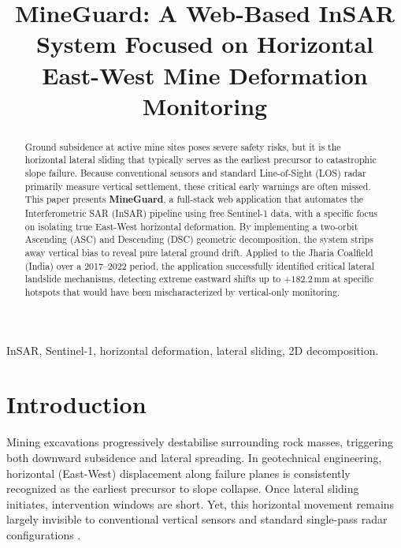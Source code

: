 \documentclass[conference]{IEEEtran}
\begin{document}
\title{MineGuard: A Web-Based InSAR System Focused on
Horizontal East-West Mine Deformation Monitoring}

\author{
}

\maketitle

\begin{abstract}
Ground subsidence at active mine sites poses severe safety risks, but
it is the horizontal lateral sliding that typically serves as the
earliest precursor to catastrophic slope failure. Because conventional
sensors and standard Line-of-Sight (LOS) radar primarily measure vertical
settlement, these critical early warnings are often missed. This paper
presents \textbf{MineGuard}, a full-stack web application that
automates the Interferometric SAR (InSAR) pipeline using free
Sentinel-1 data, with a specific focus on isolating true East-West
horizontal deformation. By implementing a two-orbit Ascending (ASC)
and Descending (DSC) geometric decomposition, the system strips away
vertical bias to reveal pure lateral ground drift. Applied to the
Jharia Coalfield (India) over a 2017–2022 period, the application
successfully identified critical lateral landslide mechanisms,
detecting extreme eastward shifts up to $+182.2$\,mm at specific 
hotspots that would have been mischaracterized by vertical-only monitoring.
\end{abstract}

\begin{IEEEkeywords}
InSAR, Sentinel-1, horizontal deformation, lateral sliding, 2D decomposition.
\end{IEEEkeywords}

\section{Introduction}

Mining excavations progressively destabilise surrounding rock masses,
triggering both downward subsidence and lateral spreading. In geotechnical
engineering, horizontal (East-West) displacement along failure planes
is consistently recognized as the earliest precursor to slope collapse.
Once lateral sliding initiates, intervention windows are short. Yet, this
horizontal movement remains largely invisible to conventional vertical
sensors and standard single-pass radar configurations \cite{cascini2010}.
\end{document}
